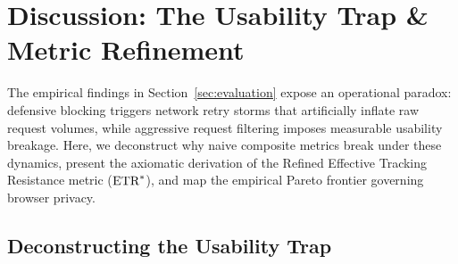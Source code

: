 \section{Discussion: The Usability Trap \& Metric Refinement}
\label{sec:discussion}

The empirical findings in Section~\ref{sec:evaluation} expose an operational paradox: defensive blocking triggers network retry storms that artificially inflate raw request volumes, while aggressive request filtering imposes measurable usability breakage. 
Here, we deconstruct why naive composite metrics break under these dynamics, present the axiomatic derivation of the Refined Effective Tracking Resistance metric ($\text{ETR}^*$), and map the empirical Pareto frontier governing browser privacy.

\subsection{Deconstructing the Usability Trap}
\label{subsec:usability_trap}

